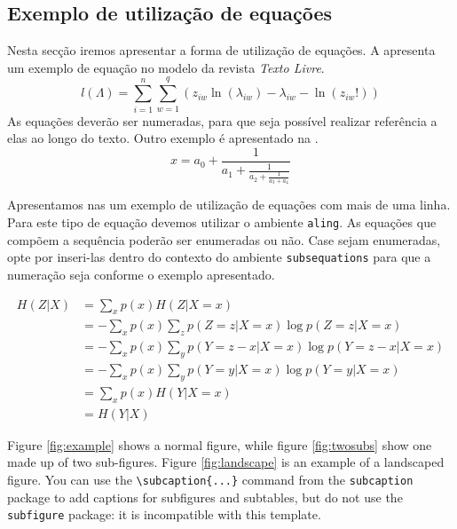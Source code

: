 \documentclass[anonymous=true]{textolivre}
\begin{document}
\subsection{Exemplo de utilização de equações}\label{sec-equacao}
Nesta secção iremos apresentar a forma de utilização de equações. A  apresenta um
exemplo de equação no modelo da revista \textit{Texto Livre}.
\begin{equation}
l(\Lambda)=\sum_{i=1}^{n} \sum_{w=1}^{q} (z_{i w} \ln (\lambda_{i w}) - \lambda_{i w} - \ln (z_{i w}!))
\label{eq-poisson}
\end{equation}
As equações deverão ser numeradas, para que seja possível realizar referência a elas ao longo do texto.
Outro exemplo é apresentado na .
\begin{equation}
  x = a_0 + \frac{1}{\displaystyle a_1 
          + \frac{1}{\displaystyle a_2 
          + \frac{1}{\displaystyle a_3 + a_4}}}
\label{eq-frac}
\end{equation}

Apresentamos nas  um exemplo de utilização de equações com mais de uma linha. Para este tipo de equação devemos utilizar o ambiente \texttt{aling}. As equações que compõem a sequência poderão ser enumeradas ou não. Case sejam enumeradas, opte por inseri-las dentro do contexto do ambiente \texttt{subsequations} para que a numeração seja conforme o exemplo apresentado.

\begin{subequations}
\begin{align}
H(Z|X) &= \sum_x p(x) H(Z|X=x) \label{eq-align-ex1} \\
       &= - \sum_x p(x) \sum_z p(Z=z|X=x) \log p(Z=z|X=x) \label{eq-align-ex2}\\
       &= - \sum_x p(x) \sum_y p(Y=z-x|X=x) \log p(Y=z-x|X=x) \label{eq-align-ex3} \\
       &= - \sum_x p(x) \sum_y p(Y=y|X=x) \log p(Y=y|X=x) \label{eq-align-ex4} \\
       &= \sum_x p(x) H(Y|X=x) \label{eq-align-ex5} \\
       &= H(Y|X) \label{eq-align-ex6}
\end{align}
\end{subequations}

Figure \ref{fig:example} shows a normal figure, while figure \ref{fig:twosubs} show one made up of two sub-figures. Figure \ref{fig:landscape} is an example of a landscaped figure. You can use the \verb|\subcaption{...}| command from the \texttt{subcaption} package to add captions for subfigures and subtables, but do not use the \texttt{subfigure} package: it is incompatible with this template.
\end{document}
